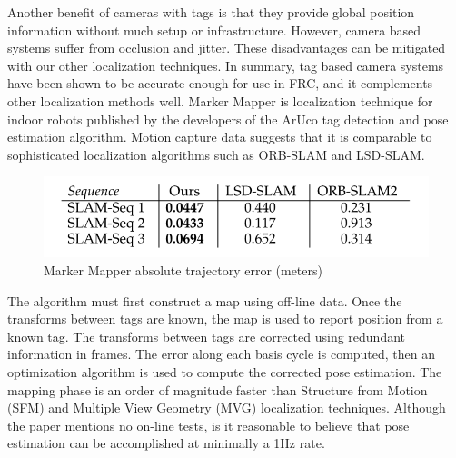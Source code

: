 \documentclass{article}
\begin{document}
  Another benefit of cameras with tags is that they provide global position information without much setup or infrastructure. However, camera based systems suffer from occlusion and jitter. These disadvantages can be mitigated with our other localization techniques. In summary, tag based camera systems have been shown to be accurate enough for use in FRC, and it complements other localization methods well.
  Marker Mapper is localization technique for indoor robots published by the developers of the ArUco tag detection and pose estimation algorithm. Motion capture data suggests that it is comparable to sophisticated localization algorithms such as ORB-SLAM and LSD-SLAM\cite{munoz-salinas_rafael_mapping_2016}.

  \begin{figure}[H]
  	\centering
    \includegraphics[width=0.5\linewidth]{./images/mm_errors.png}
    \caption{Marker Mapper absolute trajectory error (meters)}
    \label{fig:mmResults}
  \end{figure}

  The algorithm must first construct a map using off-line data. Once the transforms between tags are known, the map is used to report position from a known tag. The transforms between tags are corrected using redundant information in frames. The error along each basis cycle is computed, then an optimization algorithm is used to compute the corrected pose estimation. The mapping phase is an order of magnitude faster than Structure from Motion (SFM) and Multiple View Geometry (MVG) localization techniques. Although the paper mentions no on-line tests, is it reasonable to believe that pose estimation can be accomplished at minimally a 1Hz rate.
\end{document}
